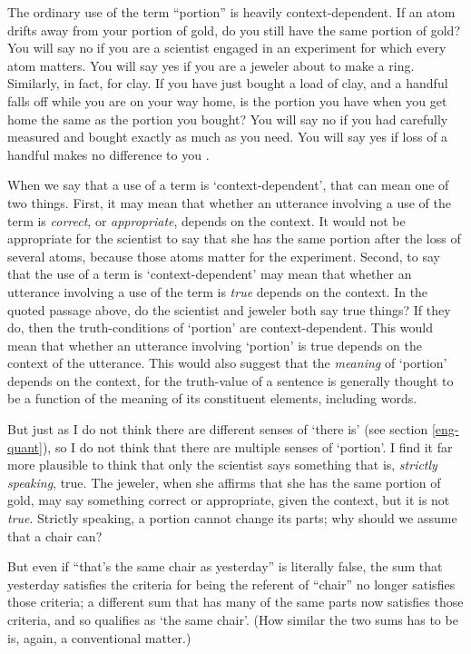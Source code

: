 \documentclass[11pt]{article}
\newenvironment{squote}{%
\begin{spacing}{1}
\begin{list}{}{%
\setlength{\labelwidth}{0pt}%
\rightmargin\leftmargin%
}
\item\relax
}{%
\end{list}%
\end{spacing}
}
\begin{document}
\begin{spacing}{1.5}
\begin{squote}
The ordinary use of the term ``portion'' is heavily context-dependent.
If an atom drifts away from your portion of gold, do you still have
the same portion of gold?  You will say no if you are a scientist
engaged in an experiment for which every atom matters. You will say
yes if you are a jeweler about to make a ring.  Similarly, in fact,
for clay.  If you have just bought a load of clay, and a handful falls
off while you are on your way home, is the portion you have when you
get home the same as the portion you bought?  You will say no if you
had carefully measured and bought exactly as much as you need.  You
will say yes if loss of a handful makes no difference to you
\citeyearpar[163]{thomson1998a}.
\end{squote}

When we say that a use of a term is `context-dependent', that can mean
one of two things.  First, it may mean that whether an utterance
involving a use of the term is {\em correct}, or {\em appropriate},
depends on the context.  It would not be appropriate for the scientist
to say that she has the same portion after the loss of several atoms,
because those atoms matter for the experiment.  Second, to say that
the use of a term is `context-dependent' may mean that whether an
utterance involving a use of the term is {\em true} depends on the
context.  In the quoted passage above, do the scientist and jeweler
both say true things?  If they do, then the truth-conditions of
`portion' are context-dependent.  This would mean that whether an
utterance involving `portion' is true depends on the context of the
utterance.  This would also suggest that the {\em meaning} of
`portion' depends on the context, for the truth-value of a sentence is
generally thought to be a function of the meaning of its constituent
elements, including words.

But just as I do not think there are different senses of `there is'
(see section \ref{eng-quant}), so I do not think that there are
multiple senses of `portion'.  I find it far more plausible to think
that only the scientist says something that is, {\em strictly
  speaking}, true.  The jeweler, when she affirms that she has the
same portion of gold, may say something correct or appropriate, given
the context, but it is not {\em true}.  Strictly speaking, a portion
cannot change its parts; why should we assume that a chair can?

But even if ``that's the same chair as yesterday'' is literally false,
the sum that yesterday satisfies the criteria for being the referent
of ``chair'' no longer satisfies those criteria; a different sum that
has many of the same parts now satisfies those criteria, and so
qualifies as `the same chair'.  (How similar the two sums has to be
is, again, a conventional matter.)


\end{spacing}
\end{document}
